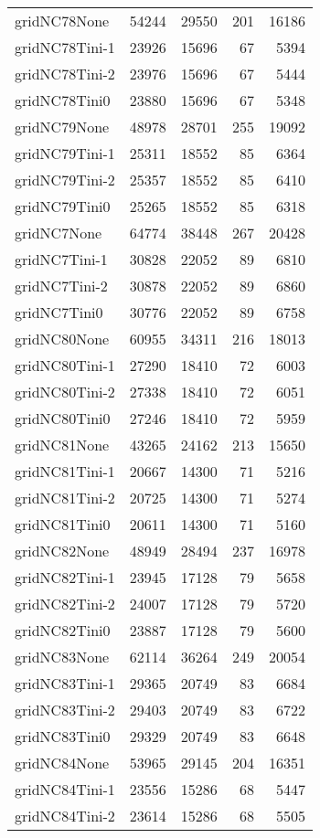 \begin{longtable}{lrrrr}
gridNC78None & 54244 & 29550 & 201 & 16186 \\
gridNC78Tini-1 & 23926 & 15696 & 67 & 5394 \\
gridNC78Tini-2 & 23976 & 15696 & 67 & 5444 \\
gridNC78Tini0 & 23880 & 15696 & 67 & 5348 \\
gridNC79None & 48978 & 28701 & 255 & 19092 \\
gridNC79Tini-1 & 25311 & 18552 & 85 & 6364 \\
gridNC79Tini-2 & 25357 & 18552 & 85 & 6410 \\
gridNC79Tini0 & 25265 & 18552 & 85 & 6318 \\
gridNC7None & 64774 & 38448 & 267 & 20428 \\
gridNC7Tini-1 & 30828 & 22052 & 89 & 6810 \\
gridNC7Tini-2 & 30878 & 22052 & 89 & 6860 \\
gridNC7Tini0 & 30776 & 22052 & 89 & 6758 \\
gridNC80None & 60955 & 34311 & 216 & 18013 \\
gridNC80Tini-1 & 27290 & 18410 & 72 & 6003 \\
gridNC80Tini-2 & 27338 & 18410 & 72 & 6051 \\
gridNC80Tini0 & 27246 & 18410 & 72 & 5959 \\
gridNC81None & 43265 & 24162 & 213 & 15650 \\
gridNC81Tini-1 & 20667 & 14300 & 71 & 5216 \\
gridNC81Tini-2 & 20725 & 14300 & 71 & 5274 \\
gridNC81Tini0 & 20611 & 14300 & 71 & 5160 \\
gridNC82None & 48949 & 28494 & 237 & 16978 \\
gridNC82Tini-1 & 23945 & 17128 & 79 & 5658 \\
gridNC82Tini-2 & 24007 & 17128 & 79 & 5720 \\
gridNC82Tini0 & 23887 & 17128 & 79 & 5600 \\
gridNC83None & 62114 & 36264 & 249 & 20054 \\
gridNC83Tini-1 & 29365 & 20749 & 83 & 6684 \\
gridNC83Tini-2 & 29403 & 20749 & 83 & 6722 \\
gridNC83Tini0 & 29329 & 20749 & 83 & 6648 \\
gridNC84None & 53965 & 29145 & 204 & 16351 \\
gridNC84Tini-1 & 23556 & 15286 & 68 & 5447 \\
gridNC84Tini-2 & 23614 & 15286 & 68 & 5505 \\

\end{longtable}
